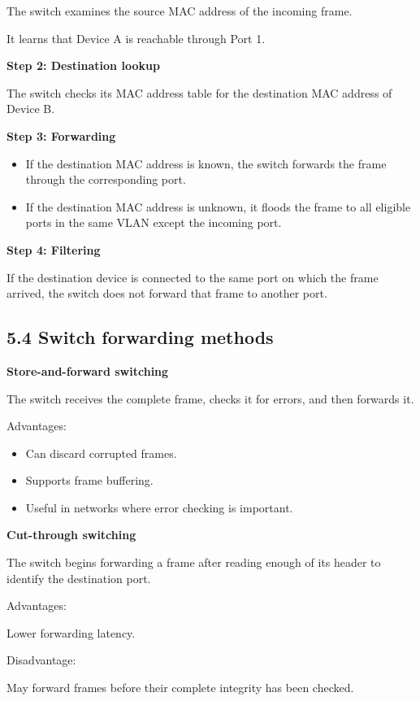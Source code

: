The switch examines the source MAC address of the incoming frame.

It learns that Device A is reachable through Port 1.

\textbf{Step 2: Destination lookup}

The switch checks its MAC address table for the destination MAC address of Device B.

\textbf{Step 3: Forwarding}

\begin{itemize}
    \item If the destination MAC address is known, the switch forwards the frame through the corresponding port.
    \item If the destination MAC address is unknown, it floods the frame to all eligible ports in the same VLAN except the incoming port.
\end{itemize}

\textbf{Step 4: Filtering}

If the destination device is connected to the same port on which the frame arrived, the switch does not forward that frame to another port.

\subsection{5.4 Switch forwarding methods}

\textbf{Store-and-forward switching}

The switch receives the complete frame, checks it for errors, and then forwards it.

Advantages:

\begin{itemize}
    \item Can discard corrupted frames.
    \item Supports frame buffering.
    \item Useful in networks where error checking is important.
\end{itemize}

\textbf{Cut-through switching}

The switch begins forwarding a frame after reading enough of its header to identify the destination port.

Advantages:

\- Lower forwarding latency.

Disadvantage:

\- May forward frames before their complete integrity has been checked.


